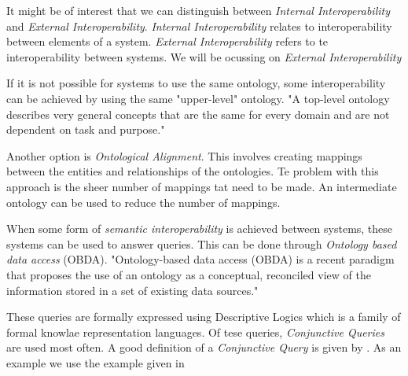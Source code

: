 \documentclass[12pt,a4paper]{article}
\begin{document}
It might be of interest that we can distinguish between \emph{Internal Interoperability} and \emph{External Interoperability}. \emph{Internal Interoperability} relates to interoperability between elements of a system. \emph{External Interoperability} refers to te interoperability between systems. \citep{Garcia2011} We will be ocussing on \emph{External Interoperability}

If it is not possible for systems to use the same ontology, some interoperability can be achieved by using the same "upper-level" ontology. "A top-level ontology describes very general concepts that are the same for every domain and are not dependent on task and purpose." \citep{VanDiggelen2007} 

Another option is \emph{Ontological Alignment}. This involves creating mappings between the entities and relationships of the ontologies. Te problem with this approach is the sheer number of mappings tat need to be made. \citep{VanDiggelen2007} An intermediate ontology can be used to reduce the number of mappings.\citep{Ciocoiu2000}\citep{VanDiggelen2007}

When some form of \emph{semantic interoperability} is achieved between systems, these systems can be used to answer queries.  This can be done through \emph{Ontology based data access} (OBDA). "Ontology-based data access (OBDA) is a recent paradigm that proposes the use of an ontology as a conceptual, reconciled view of the information stored in a set of
existing data sources." \citep{Bien2015}

These queries are formally expressed using Descriptive Logics which is a family of formal knowlae representation languages. Of tese queries, \emph{Conjunctive Queries} are used most often. \cite{Bien2015} A good definition of a \emph{Conjunctive Query} is given by \cite{Dolby2008}. As an example we use the example given in \cite{kon2013} 


\end{document}
